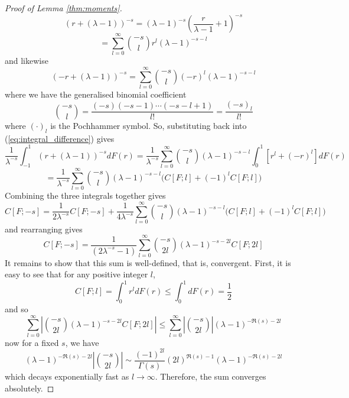 \documentclass{article}
\newcommand{\tti}{\rightarrow\infty}
\begin{document}
\begin{proof}[Proof of Lemma \ref{thm:moments}]
\begin{equation}
        (r+(\lambda-1))^{-s} = (\lambda-1)^{-s}\left(\frac{r}{\lambda-1} + 1\right)^{-s}
    \end{equation}
    \begin{equation}
        = \sum_{l=0}^{\infty} \binom{-s}{l}r^{l}(\lambda-1)^{-s-l}
    \end{equation}
    and likewise
    \begin{equation}
        (-r+(\lambda-1))^{-s} = \sum_{l=0}^{\infty} \binom{-s}{l}(-r)^{l}(\lambda-1)^{-s-l}
    \end{equation}
    where we have the generalised binomial coefficient
    \begin{equation}
        \binom{-s}{l} = \frac{(-s)(-s-1)\cdots(-s-l+1)}{l!} = \frac{(-s)_l}{l!}
    \end{equation}
    where $(\cdot)_l$ is the Pochhammer symbol. So, substituting back into (\ref{eq:integral_difference}) gives
    \begin{equation}
        \frac{1}{\lambda^{-s}}\int_{-1}^1(r+(\lambda-1))^{-s}dF(r) = \frac{1}{\lambda^{-s}}\sum_{l=0}^{\infty}\binom{-s}{l}(\lambda-1)^{-s-l}\int_0^1\left[r^{l} + (-r)^l\right]dF(r)
    \end{equation}
    \begin{equation}
        =  \frac{1}{\lambda^{-s}}\sum_{l=0}^{\infty}\binom{-s}{l}(\lambda-1)^{-s-l}(C[F;l] + (-1)^{l}C{[F;l])}
    \end{equation}
    Combining the three integrals together gives
    \begin{equation}
        C[F;-s] = \frac{1}{2\lambda^{-s}}C[F;-s] + \frac{1}{4\lambda^{-s}}\sum_{l=0}^{\infty}\binom{-s}{l}(\lambda-1)^{-s-l}(C[F;l] + (-1)^{l}C{[F;l])}
    \end{equation}
    and rearranging gives
    \begin{equation}
        C[F;-s] = \frac{1}{(2\lambda^{-s}-1)}\sum_{l=0}^{\infty}\binom{-s}{2l}(\lambda-1)^{-s-2l}C[F;2l]
    \end{equation}
    It remains to show that this sum is well-defined, that is, convergent. First, it is easy to see that for any positive integer $l$,
    \begin{equation}
        C[F;l] = \int_0^1 r^ldF(r) \leq \int_0^1dF(r) = \frac{1}{2}
    \end{equation}
    and so
    \begin{equation}
        \sum_{l=0}^{\infty}\left|\binom{-s}{2l}(\lambda-1)^{-s-2l}C[F;2l]\right| \leq \sum_{l=0}^{\infty}\left|\binom{-s}{2l}\right|(\lambda-1)^{-\Re(s)-2l}
    \end{equation}
    now for a fixed $s$, we have
    \begin{equation}
        (\lambda-1)^{-\Re(s)-2l}\left|\binom{-s}{2l}\right| \sim \frac{(-1)^{2l}}{\Gamma(s)} (2l)^{\Re(s)-1}(\lambda-1)^{-\Re(s)-2l}
    \end{equation}
    which decays exponentially fast as $l\tti$. Therefore, the sum converges absolutely.
\end{proof}
\end{document}
